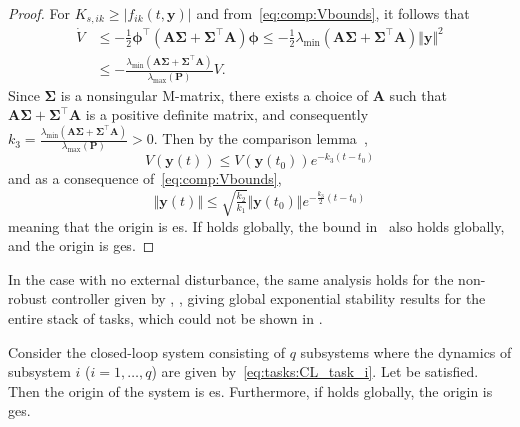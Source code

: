 \documentclass[../main.tex]{subfiles}
\begin{document}
\begin{proof}
    For $K_{s,ik} \geq |f_{ik}(t,\bm{y})|$ and from~\eqref{eq:comp:Vbounds}, it follows that
    \begin{equation} \label{V_dot_ES}
        \begin{split}
            \dot{V} &\leq -\tfrac{1}{2} \bm{\phi}^\top (\bm{A} \bm{\Sigma} + \bm{\Sigma}^\top \bm{A} ) \bm{\phi} \leq -\tfrac{1}{2} \lambda_{\min}(\bm{A} \bm{\Sigma} + \bm{\Sigma}^\top \bm{A} ) \Vert \bm{y} \Vert^2\\
            &\leq - \frac{\lambda_{\min}(\bm{A} \bm{\Sigma} + \bm{\Sigma}^\top \bm{A} )}{\lambda_{\max}(\bm{P})} V.
        \end{split}
    \end{equation}
    Since $\bm{\Sigma}$ is a nonsingular M-matrix, there exists a choice of $\bm{A}$ such that $\bm{A} \bm{\Sigma} + \bm{\Sigma}^\top \bm{A}$ is a positive definite matrix, and consequently $k_3 = \frac{\lambda_{\min}(\bm{A} \bm{\Sigma} + \bm{\Sigma}^\top \bm{A} )}{\lambda_{\max}(\bm{P})} > 0$. Then by the comparison lemma~\cite[Lemma 3.4]{Khalil},
    \begin{equation}
        V(\bm{y}(t)) \leq V(\bm{y}(t_0)) e^{-k_3(t-t_0)}
    \end{equation}
    and as a consequence of~\eqref{eq:comp:Vbounds},
    \begin{equation}
        \Vert \bm{y}(t) \Vert \leq \sqrt{\tfrac{k_2}{k_1}} \Vert \bm{y}(t_0) \Vert e^{-\frac{k_3}{2}(t-t_0)}
    \end{equation}
    meaning that the origin is \gls{es}.
    If  holds globally, the bound in~ also holds globally, and the origin is \gls{ges}.
\end{proof}

In the case with no external disturbance, the same analysis holds for the non-robust controller given by , , giving global exponential stability results for the entire stack of tasks, which could not be shown in \cite{Saeboe2022}.
\begin{corollary}\label{corollary:comp:GES}
   Consider the closed-loop system consisting of $q$ subsystems where the dynamics of subsystem $i$ ($i=1,\ldots,q$) are given by~\eqref{eq:tasks:CL_task_i}. Let  be satisfied.
    Then the origin of the system is \gls{es}. Furthermore, if  holds globally, the origin is \gls{ges}.
\end{corollary}
\end{document}
